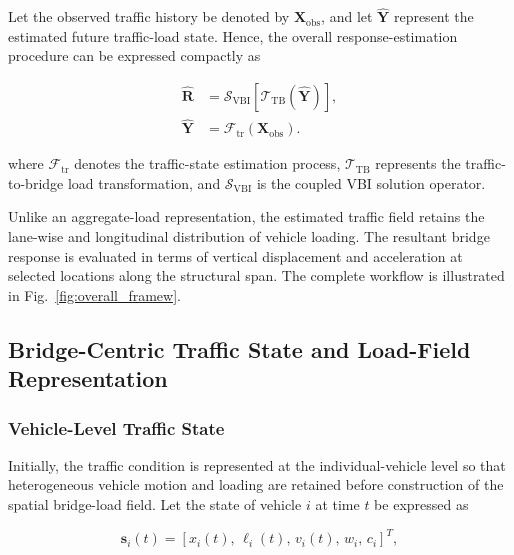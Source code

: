 \documentclass[journal]{IEEEtran}
\begin{document}
Let the observed traffic history be denoted by $\mathbf{X}_{\mathrm{obs}}$, and let $\widehat{\mathbf{Y}}$ represent the estimated future traffic-load state. Hence, the overall response-estimation procedure can be expressed compactly as

\begin{equation}
\begin{aligned}
\widehat{\mathbf{R}}
&=
\mathcal{S}_{\mathrm{VBI}}
\left[
\mathcal{T}_{\mathrm{TB}}
\left(
\widehat{\mathbf{Y}}
\right)
\right],
\\
\widehat{\mathbf{Y}}
&=
\mathcal{F}_{\mathrm{tr}}
\left(
\mathbf{X}_{\mathrm{obs}}
\right).
\end{aligned}
\label{eq:overall_framework}
\end{equation}

where $\mathcal{F}_{\mathrm{tr}}$ denotes the traffic-state estimation process, $\mathcal{T}_{\mathrm{TB}}$ represents the traffic-to-bridge load transformation, and $\mathcal{S}_{\mathrm{VBI}}$ is the coupled VBI solution operator.

Unlike an aggregate-load representation, the estimated traffic field retains the lane-wise and longitudinal distribution of vehicle loading. The resultant bridge response is evaluated in terms of vertical displacement and acceleration at selected locations along the structural span. The complete workflow is illustrated in Fig.~\ref{fig:overall_framew}.

\subsection{Bridge-Centric Traffic State and Load-Field Representation}
\label{sec:traffic_state_representation}

\subsubsection{Vehicle-Level Traffic State}
\label{subsec:vehicle_state}

Initially, the traffic condition is represented at the individual-vehicle level so that heterogeneous vehicle motion and loading are retained before construction of the spatial bridge-load field. Let the state of vehicle $i$ at time $t$ be expressed as

\begin{equation}
\mathbf{s}_{i}(t)
=
\left[
x_i(t),\,
\ell_i(t),\,
v_i(t),\,
w_i,\,
c_i
\right]^{T},
\label{eq:vehicle_state}
\end{equation}
\end{document}
